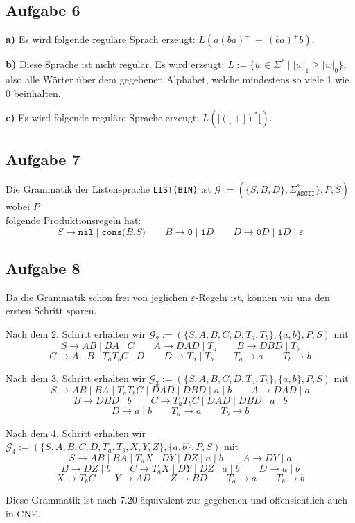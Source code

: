 \documentclass[a4paper,graphics,11pt]{article}
\newcommand{\aufgabe}[1]{\subsection*{Aufgabe #1}}
\begin{document}
\aufgabe{6}
\textbf{a)}
Es wird folgende reguläre Sprach erzeugt: $L(a(ba)^+\ +\ (ba)^+ b)$.

\textbf{b)}
Diese Sprache ist nicht regulär. Es wird erzeugt: $L := \{w \in \Sigma^* \mid |w|_1 \geq |w|_0\}$, also
alle Wörter über dem gegebenen Alphabet, welche mindestens so viele 1 wie 0 beinhalten.

\textbf{c)}
Es wird folgende reguläre Sprache erzeugt: $L(\texttt{]}(\texttt{[} + \texttt{]})^*\texttt{[})$.

\newpage

\aufgabe{7}
Die Grammatik der Listensprache \texttt{LIST(BIN)} ist
$\mathcal{G} := (\{S, B, D\}, \Sigma^*_{\texttt{ASCII}}\}, P, S)$ wobei $P$\\
folgende Produktionsregeln hat:
$$
    S \to \texttt{nil} \mid \texttt{cons(}B\texttt{,}S\texttt{)}
    \qquad
    B \to \texttt{0} \mid \texttt{1}D
    \qquad
    D \to \texttt{0}D \mid \texttt{1}D \mid \varepsilon
$$

\aufgabe{8}
Da die Grammatik schon frei von jeglichen $\varepsilon$-Regeln ist, können wir uns den ersten Schritt sparen.

Nach dem 2. Schritt erhalten wir $\mathcal{G}_2 := (\{S, A, B, C, D, T_a, T_b\}, \{a,b\}, P, S)$ mit
$$
    S \to AB \mid BA \mid C
    \qquad
    A \to DAD \mid T_a
    \qquad
    B \to DBD \mid T_b
$$$$
    C \to A \mid B \mid T_aT_bC \mid D
    \qquad
    D \to T_a \mid T_b
    \qquad
    T_a \to a
    \qquad
    T_b \to b
$$

Nach dem 3. Schritt erhalten wir $\mathcal{G}_3 := (\{S, A, B, C, D, T_a, T_b\}, \{a,b\}, P, S)$ mit
$$
    S \to AB \mid BA \mid T_aT_bC \mid DAD \mid DBD \mid a \mid b
    \qquad
    A \to DAD \mid a
$$$$
    B \to DBD \mid b
    \qquad
    C \to T_aT_bC \mid DAD \mid DBD \mid a \mid b
$$$$
    D \to a \mid b
    \qquad
    T_a \to a
    \qquad
    T_b \to b
$$

Nach dem 4. Schritt erhalten wir $\mathcal{G}_4 := (\{S, A, B, C, D, T_a, T_b, X, Y, Z\}, \{a,b\}, P, S)$ mit
$$
    S \to AB \mid BA \mid T_aX \mid DY \mid DZ \mid a \mid b
    \qquad
    A \to DY \mid a
$$$$
    B \to DZ \mid b
    \qquad
    C \to T_aX \mid DY \mid DZ \mid a \mid b
    \qquad
    D \to a \mid b
$$$$
    X \to T_bC
    \qquad
    Y \to AD
    \qquad
    Z \to BD
    \qquad
    T_a \to a
    \qquad
    T_b \to b
$$

Diese Grammatik ist nach 7.20 äquivalent zur gegebenen und offensichtlich auch in CNF.
\end{document}
